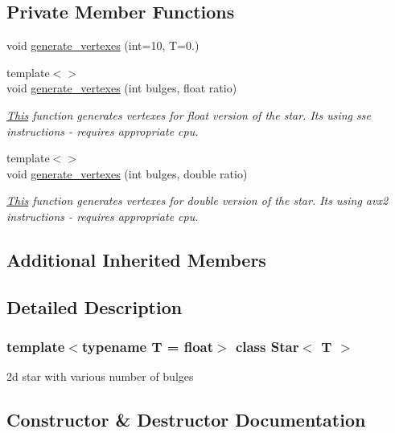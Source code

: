 \subsection*{Private Member Functions}
\begin{DoxyCompactItemize}
\item 
void \mbox{\hyperlink{classStar_ac9ce42a8f7289484594f7f0ab5124849}{generate\+\_\+vertexes}} (int=10, T=0.)
\item 
{\footnotesize template$<$$>$ }\\void \mbox{\hyperlink{classStar_ab46cbc7aca971bc1c07b8d4afe8fba37}{generate\+\_\+vertexes}} (int bulges, float ratio)
\begin{DoxyCompactList}\small\item\em \mbox{\hyperlink{classThis}{This}} function generates vertexes for float version of the star. It\textquotesingle{}s using sse instructions -\/ requires appropriate cpu. \end{DoxyCompactList}\item 
{\footnotesize template$<$$>$ }\\void \mbox{\hyperlink{classStar_a85d8438cea72701a136b76f046ee95dd}{generate\+\_\+vertexes}} (int bulges, double ratio)
\begin{DoxyCompactList}\small\item\em \mbox{\hyperlink{classThis}{This}} function generates vertexes for double version of the star. It\textquotesingle{}s using avx2 instructions -\/ requires appropriate cpu. \end{DoxyCompactList}\end{DoxyCompactItemize}
\subsection*{Additional Inherited Members}


\subsection{Detailed Description}
\subsubsection*{template$<$typename T = float$>$\newline
class Star$<$ T $>$}

2d star with various number of bulges 

\subsection{Constructor \& Destructor Documentation}
\mbox{\label{classStar_a4be07c82320f781071409294614df4ae}} 
